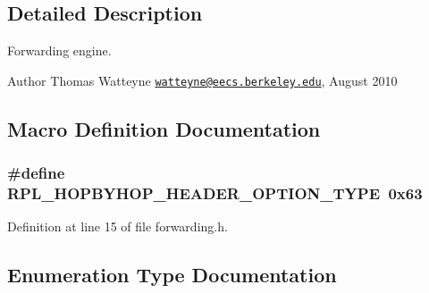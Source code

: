 \subsection{Detailed Description}
Forwarding engine. 

\begin{DoxyAuthor}{Author}
Thomas Watteyne \href{mailto:watteyne@eecs.berkeley.edu}{\tt watteyne@eecs.\+berkeley.\+edu}, August 2010 
\end{DoxyAuthor}


\subsection{Macro Definition Documentation}
\subsubsection[{\texorpdfstring{R\+P\+L\+\_\+\+H\+O\+P\+B\+Y\+H\+O\+P\+\_\+\+H\+E\+A\+D\+E\+R\+\_\+\+O\+P\+T\+I\+O\+N\+\_\+\+T\+Y\+PE}{RPL_HOPBYHOP_HEADER_OPTION_TYPE}}]{\setlength{\rightskip}{0pt plus 5cm}\#define R\+P\+L\+\_\+\+H\+O\+P\+B\+Y\+H\+O\+P\+\_\+\+H\+E\+A\+D\+E\+R\+\_\+\+O\+P\+T\+I\+O\+N\+\_\+\+T\+Y\+PE~0x63}\hypertarget{group___forwarding_gae88a822ccea38205da29ece34f87e337}{}\label{group___forwarding_gae88a822ccea38205da29ece34f87e337}


Definition at line 15 of file forwarding.\+h.



\subsection{Enumeration Type Documentation}

